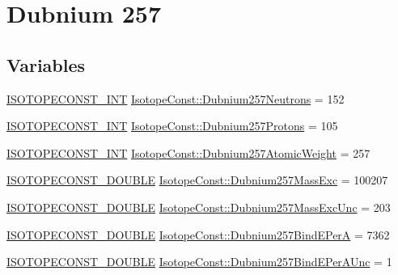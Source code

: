 \hypertarget{group___isotope_const-_dubnium-_db257}{}\section{Dubnium 257}
\label{group___isotope_const-_dubnium-_db257}
\subsection*{Variables}
\begin{DoxyCompactItemize}
\item 
\mbox{\hyperlink{group___isotope_const-_macros_ga5f18360b3e99483a35c32d789e62621c}{I\+S\+O\+T\+O\+P\+E\+C\+O\+N\+S\+T\+\_\+\+I\+NT}} \mbox{\hyperlink{group___isotope_const-_dubnium-_db257_gab2e77c0612f8385d0abad835862a12a7}{Isotope\+Const\+::\+Dubnium257\+Neutrons}} = 152
\item 
\mbox{\hyperlink{group___isotope_const-_macros_ga5f18360b3e99483a35c32d789e62621c}{I\+S\+O\+T\+O\+P\+E\+C\+O\+N\+S\+T\+\_\+\+I\+NT}} \mbox{\hyperlink{group___isotope_const-_dubnium-_db257_ga122a492de466f17a4a67f91bcf3ed765}{Isotope\+Const\+::\+Dubnium257\+Protons}} = 105
\item 
\mbox{\hyperlink{group___isotope_const-_macros_ga5f18360b3e99483a35c32d789e62621c}{I\+S\+O\+T\+O\+P\+E\+C\+O\+N\+S\+T\+\_\+\+I\+NT}} \mbox{\hyperlink{group___isotope_const-_dubnium-_db257_ga33d25be9a40b9d03270ed917ff6051b9}{Isotope\+Const\+::\+Dubnium257\+Atomic\+Weight}} = 257
\item 
\mbox{\hyperlink{group___isotope_const-_macros_ga8f45a7272ce02c0b4c65c44636ed719a}{I\+S\+O\+T\+O\+P\+E\+C\+O\+N\+S\+T\+\_\+\+D\+O\+U\+B\+LE}} \mbox{\hyperlink{group___isotope_const-_dubnium-_db257_ga5d5207655b212246e5fbeaa468c28fa6}{Isotope\+Const\+::\+Dubnium257\+Mass\+Exc}} = 100207
\item 
\mbox{\hyperlink{group___isotope_const-_macros_ga8f45a7272ce02c0b4c65c44636ed719a}{I\+S\+O\+T\+O\+P\+E\+C\+O\+N\+S\+T\+\_\+\+D\+O\+U\+B\+LE}} \mbox{\hyperlink{group___isotope_const-_dubnium-_db257_gaceaecabd5b67aea1a8bc0c93c58f82cf}{Isotope\+Const\+::\+Dubnium257\+Mass\+Exc\+Unc}} = 203
\item 
\mbox{\hyperlink{group___isotope_const-_macros_ga8f45a7272ce02c0b4c65c44636ed719a}{I\+S\+O\+T\+O\+P\+E\+C\+O\+N\+S\+T\+\_\+\+D\+O\+U\+B\+LE}} \mbox{\hyperlink{group___isotope_const-_dubnium-_db257_gaa5d8696391cac9188dc5f07de58d9e2c}{Isotope\+Const\+::\+Dubnium257\+Bind\+E\+PerA}} = 7362
\item 
\mbox{\hyperlink{group___isotope_const-_macros_ga8f45a7272ce02c0b4c65c44636ed719a}{I\+S\+O\+T\+O\+P\+E\+C\+O\+N\+S\+T\+\_\+\+D\+O\+U\+B\+LE}} \mbox{\hyperlink{group___isotope_const-_dubnium-_db257_ga926cf280ea5f7fa35cec6d65685ecaa2}{Isotope\+Const\+::\+Dubnium257\+Bind\+E\+Per\+A\+Unc}} = 1

\end{DoxyCompactItemize}
